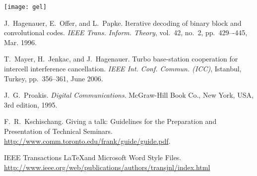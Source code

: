 \documentclass[journal, a4paper]{IEEEtran}
\begin{document}
\texttt{[image: gel]}

\begin{thebibliography}{5}
    J.~Hagenauer, E.~Offer, and L.~Papke. Iterative decoding of binary block
    and convolutional codes. {\em IEEE Trans. Inform. Theory},
    vol.~42, no.~2, pp.~429–-445, Mar. 1996.

    T.~Mayer, H.~Jenkac, and J.~Hagenauer. Turbo base-station cooperation for intercell interference cancellation. {\em IEEE Int. Conf. Commun. (ICC)}, Istanbul, Turkey, pp.~356--361, June 2006.

    J.~G.~Proakis. {\em Digital Communications}. McGraw-Hill Book Co.,
    New York, USA, 3rd edition, 1995.

    F.~R.~Kschischang. Giving a talk: Guidelines for the Preparation and Presentation of Technical Seminars.
    \url{http://www.comm.toronto.edu/frank/guide/guide.pdf}.

    IEEE Transactions \LaTeX and Microsoft Word Style Files.
    \url{http://www.ieee.org/web/publications/authors/transjnl/index.html}


\end{thebibliography}

\end{document}
